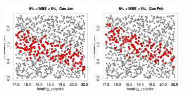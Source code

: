 \documentclass[a4paper, 12pt]{article}
\begin{document}
\renewcommand{\scale}{12.2em}
\begin{figure}
\centering
 \includegraphics[width=\scale]{MBE/SelectedMBE_Gas_01.pdf}
 \includegraphics[width=\scale]{MBE/SelectedMBE_Gas_02.pdf}

\end{figure}
\end{document}
